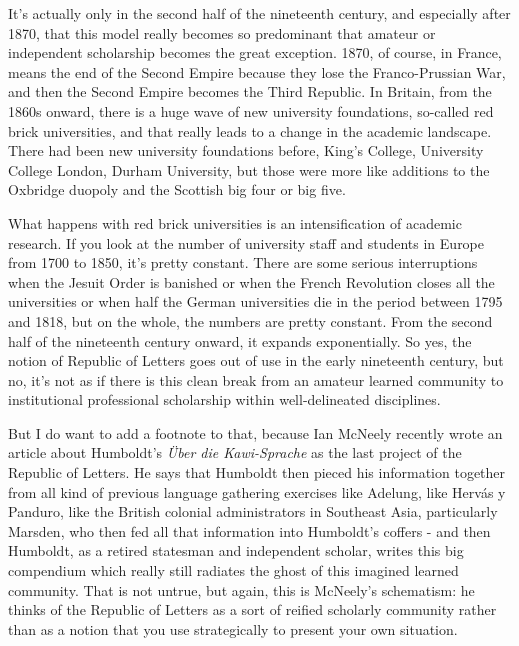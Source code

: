 \documentclass[output=paper]{langscibook}
\begin{document}
It’s actually only in the second half of the nineteenth century, and especially after 1870, that this model really becomes so predominant that amateur or independent scholarship becomes the great exception. 1870, of course, in France, means the end of the Second Empire because they lose the Franco-Prussian War, and then the Second Empire becomes the Third Republic. In Britain, from the 1860s onward, there is a huge wave of new university foundations, so-called red brick universities, and that really leads to a change in the academic landscape. There had been new university foundations before, King’s College, University College London, Durham University, but those were more like additions to the Oxbridge duopoly and the Scottish big four or big five. 

What happens with red brick universities is an intensification of academic research. If you look at the number of university staff and students in Europe from 1700 to 1850, it’s pretty constant. There are some serious interruptions when the Jesuit Order is banished or when the French Revolution closes all the universities or when half the German universities die in the period between 1795 and 1818, but on the whole, the numbers are pretty constant. From the second half of the nineteenth century onward, it expands exponentially. So yes, the notion of Republic of Letters goes out of use in the early nineteenth century, but no, it’s not as if there is this clean break from an amateur learned community to institutional professional scholarship within well-delineated disciplines. 

But I do want to add a footnote to that, because Ian McNeely recently wrote an article about Humboldt’s \textit{Über die Kawi-Sprache} as the last project of the Republic of Letters. He says that Humboldt then pieced his information together from all kind of previous language gathering exercises like Adelung, like Hervás y Panduro, like the British colonial administrators in Southeast Asia, particularly Marsden, who then fed all that information into Humboldt’s coffers - and then Humboldt, as a retired statesman and independent scholar, writes this big compendium which really still radiates the ghost of this imagined learned community. That is not untrue, but again, this is McNeely’s schematism: he thinks of the Republic of Letters as a sort of reified scholarly community rather than as a notion that you use strategically to present your own situation. 
\end{document}
